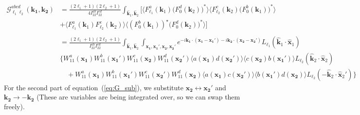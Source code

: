 \documentclass[a4paper,11pt]{article}
\begin{document}
\begin{align}
\mathcal{G}_{\ell_1 \ell_2}^{a b c d}(\boldsymbol{k_1}, \boldsymbol{k_2}) &=\frac{(2\ell_1 + 1)(2\ell_2 + 1)}{4I_{22}^{ab} I_{22}^{cd}}\int_{\hat{\boldsymbol{k}}_1, \hat{\boldsymbol{k}}_2} \Big[\big\langle F_{\ell_1}^a(\boldsymbol{k}_1) \big(F_0^d(\boldsymbol{k}_2)\big)^* \big\rangle \big\langle F_{\ell_2}^c(\boldsymbol{k}_2) \big(F_0^b(\boldsymbol{k}_1)\big)^* \big\rangle \nonumber\\
&+ \big\langle F_{\ell_1}^a(\boldsymbol{k}_1) F_{\ell_2}^{c}(\boldsymbol{k}_2) \big\rangle \big\langle (F_0^b(\boldsymbol{k}_1))^{\star} \big(F_0^d(\boldsymbol{k}_2)\big)^* \big\rangle \Big] \nonumber\\
\nonumber\\
&= \frac{(2\ell_1 + 1)(2\ell_2 + 1)}{I_{22}^{ab} I_{22}^{cd}}\int_{\hat{\boldsymbol{k}}_1, \hat{\boldsymbol{k}}_2} \int_{\boldsymbol{x_1}, \boldsymbol{x_1}', \boldsymbol{x_2}, \boldsymbol{x_2}'} e^{-i \boldsymbol{k_1} \cdot (\boldsymbol{x_1} - \boldsymbol{x_1}') - i \boldsymbol{k_2} \cdot (\boldsymbol{x_2} - \boldsymbol{x_2}')} L_{\ell_1}(\hat{\boldsymbol{k}}_1 \cdot \hat{\boldsymbol{x}}_1) \nonumber\\
& \Bigg\{W_{11}^a(\boldsymbol{x_1}) W_{11}^b(\boldsymbol{x_1}') W_{11}^c(\boldsymbol{x_2}) W_{11}^d(\boldsymbol{x_2}')
\langle a(\boldsymbol{x_1}) d(\boldsymbol{x_2}') \rangle \langle c(\boldsymbol{x_2}) b(\boldsymbol{x_1}') \rangle L_{\ell_2}(\hat{\boldsymbol{k}}_2 \cdot \hat{\boldsymbol{x}}_2) \nonumber\\
&\quad + W_{11}^a(\boldsymbol{x_1}) W_{11}^b(\boldsymbol{x_1}') W_{11}^c(\boldsymbol{x_2}') W_{11}^d(\boldsymbol{x_2})\langle a(\boldsymbol{x_1}) c(\boldsymbol{x_2}') \rangle \langle b(\boldsymbol{x_1}') d(\boldsymbol{x_2}) \rangle L_{\ell_2}(-\hat{\boldsymbol{k}}_2 \cdot \hat{\boldsymbol{x}}_2') \Bigg\}
\label{eq:G_sub}
\end{align}
For the second part of equation~(\ref{eq:G_sub}), we substitute \(\boldsymbol{x_2} \leftrightarrow \boldsymbol{x_2}'\) and \(\boldsymbol{k_2} \rightarrow -\boldsymbol{k_2}\) (These are variables are being integrated over, so we can swap them freely).
\end{document}

